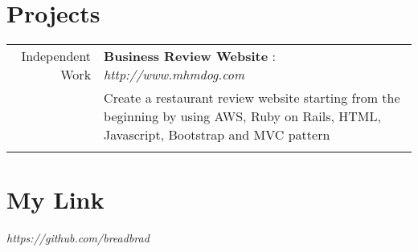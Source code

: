 \documentclass[a4paper,11pt]{article}
\begin{document}
				\section{Projects}
				\begin{tabular}{r|p{11cm}}
				 Independent Work & \textbf{Business Review Website} : \emph{http://www.mhmdog.com}\\ 
				  & Create a restaurant review website starting from the beginning by using AWS, Ruby on Rails, HTML, Javascript, Bootstrap and MVC pattern \\
				   &  \fontsize{10}{12}\selectfont{ - https://github.com/breadbrad/gourmet }
				   \end{tabular}


				   \section{My Link}

				    \emph{https://github.com/breadbrad}


				    
\end{document}

